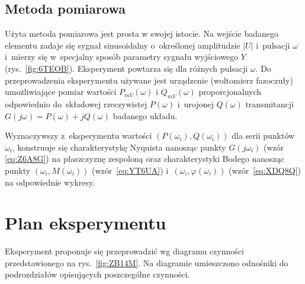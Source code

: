 \documentclass[paper=a4,DIV=12]{lpas}
\begin{document}
\begin{appendices}
  \subsection{Metoda pomiarowa}
  \label{sec:FTYRD}

  Użyta metoda pomiarowa jest prosta w swojej istocie. Na wejście badanego
  elementu zadaje się sygnał sinusoidalny o~określonej amplitudzie $|U|$
  i~pulsacji $\omega$ i~mierzy się w~specjalny sposób parametry sygnału
  wyjściowego $Y$ (rys.~\ref{fig:6TEOB}). Eksperyment powtarza się dla różnych
  pulsacji $\omega$. Do przeprowadzenia eksperymentu używane jest urządzenie
  (woltomierz fazoczuły) umożliwiające pomiar wartości $P_{mV}(\omega)$ i
  $Q_{mV}(\omega)$ proporcjonalnych odpowiednio do~składowej rzeczywistej
  $P(\omega)$ i~urojonej $Q(\omega)$ transmitancji $G(j \omega) = P(\omega) + j
  Q(\omega)$ badanego układu.

  Wyznaczywszy z~eksperymentu wartości $(P(\omega_i), Q(\omega_i))$ dla serii
  punktów $\omega_i$, konstruuje się charakterystykę Nyquista nanosząc punkty
  $G(j\omega_i)$ (wzór \eqref{eq:Z6A8G}) na płaszczyznę zespoloną oraz
  charakterystyki Bodego nanosząc punkty $(\omega_i, M(\omega_i))$
  (wzór~\eqref{eq:YT6UA}) i~$(\omega_i, \varphi(\omega_i))$
  (wzór~\eqref{eq:XDQ8Q}) na odpowiednie wykresy.

  \section{Plan eksperymentu}
  \label{sec:0DR40}

  Eksperyment proponuje się przeprowadzić wg diagramu czynności przedstawionego
  na rys.~\ref{fig:ZB14M}. Na diagramie umieszczono odnośniki do podrozdziałów
  opisujących poszczególne czynności.
  \begin{figure}[H]
    \centering
\end{figure}
\end{appendices}
\end{document}
